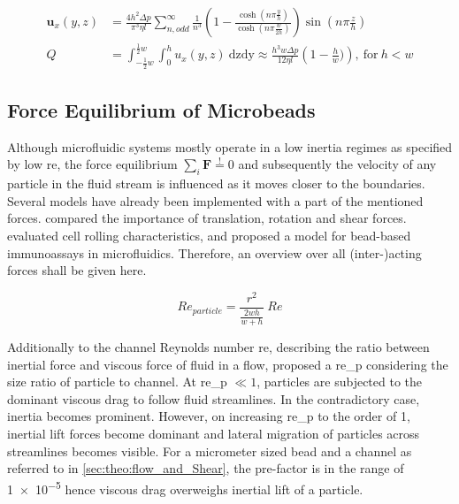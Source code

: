   \begin{align}
\mathbf{u}   _x(y,z) &= \frac{4 h^2 \Delta p}{\pi^3 \eta l} \sum_{n,odd}^{\infty} \frac{1}{n^3} \left( 1- \frac{\cosh (n \pi \frac{y}{h})}{\cosh (n \pi \frac{w}{2h})} \right) \sin (n \pi \frac{z}{h}) \label{eq:flowVelocityRect} \\
  Q    &= \int_{-\frac{1}{2}w}^{\frac{1}{2}w} \int_{0}^{h} u   _x(y,z) \ \mathrm{dzdy} \approx \frac{h^3 w \Delta p}{12 \eta l} \left( 1 - \frac{h}{w}) \right) \label{eq:flowRateRect} \mathrm{, \ for \ } h < w
\end{align}


\subsection{Force Equilibrium of Microbeads}
\label{sec:theo:force}
Although microfluidic systems mostly operate in a low inertia regimes as specified by low \gls{re}, the force equilibrium $\sum_{i} \mathbf{F} \overset{!}{=} 0$ and subsequently the velocity of any particle in the fluid stream is influenced as it moves closer to the boundaries. Several models have already been implemented with a part of the mentioned forces. \citet{lit:fluid:comparison} compared the importance of translation, rotation and shear forces. \citet{lit:fluidics:RollingCharacteristics} evaluated cell rolling characteristics, and \citet{lit:fluidic:ModelMIT} proposed a model for bead-based immunoassays in microfluidics. Therefore, an overview over all (inter-)acting forces shall be given here.

\begin{equation}
	\mathit{Re}_{particle} = \frac{r^2}{\frac{2wh}{w+h}} \ \mathit{Re} 
\end{equation}

Additionally to the channel Reynolds number \gls{re}, describing the ratio between inertial force and viscous force of fluid in a flow, \citet{lit:fluidic:f_wall} proposed a \gls{re_p} considering the size ratio of particle to channel. At \gls{re_p} $\ll 1$, particles are subjected to the dominant viscous drag to follow fluid streamlines. In the contradictory case, inertia becomes prominent. However, on increasing \gls{re_p} to the order of 1, inertial lift forces become dominant and lateral migration of particles across streamlines becomes visible.  For a micrometer sized bead and a channel as referred to in \cref{sec:theo:flow_and_Shear}, the pre-factor is in the range of \num{1e-5} hence viscous drag overweighs inertial lift of a particle.

